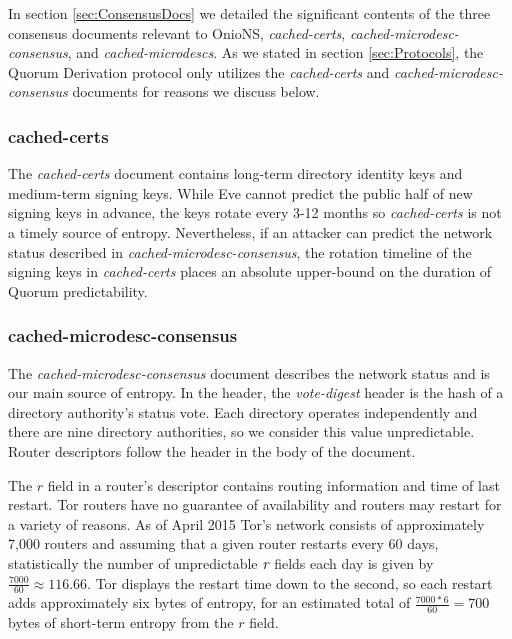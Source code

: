 \documentclass{sig-alternate}
\begin{document}
In section \ref{sec:ConsensusDocs} we detailed the significant contents of the three consensus documents relevant to OnioNS, \emph{cached-certs}, \emph{cached-microdesc-consensus}, and \emph{cached-microdescs}. As we stated in section \ref{sec:Protocols}, the Quorum Derivation protocol only utilizes the \emph{cached-certs} and \emph{cached-microdesc-consensus} documents for reasons we discuss below.

\subsubsection{cached-certs}

The \emph{cached-certs} document contains long-term directory identity keys and medium-term signing keys. While Eve cannot predict the public half of new signing keys in advance, the keys rotate every 3-12 months\cite{TorDirSpec} so \emph{cached-certs} is not a timely source of entropy. Nevertheless, if an attacker can predict the network status described in \emph{cached-microdesc-consensus}, the rotation timeline of the signing keys in \emph{cached-certs} places an absolute upper-bound on the duration of Quorum predictability.

\subsubsection{cached-microdesc-consensus}

The \emph{cached-microdesc-consensus} document describes the network status and is our main source of entropy. In the header, the  \emph{vote-digest} header is the hash of a directory authority's status vote. Each directory operates independently and there are nine directory authorities, so we consider this value unpredictable. Router descriptors follow the header in the body of the document. 

The $ r $ field in a router's descriptor contains routing information and time of last restart. Tor routers have no guarantee of availability and routers may restart for a variety of reasons. As of April 2015 Tor's network consists of approximately 7,000 routers \cite{TorMetrics} and assuming that a given router restarts every 60 days, statistically the number of unpredictable $ \emph{r} $ fields each day is given by $ \frac{7000}{60} \approx 116.66 $. Tor displays the restart time down to the second, so each restart adds approximately six bytes of entropy, for an estimated total of $ \frac{7000 * 6}{60} = 700 $ bytes of short-term entropy from the $ r $ field.
\end{document}
